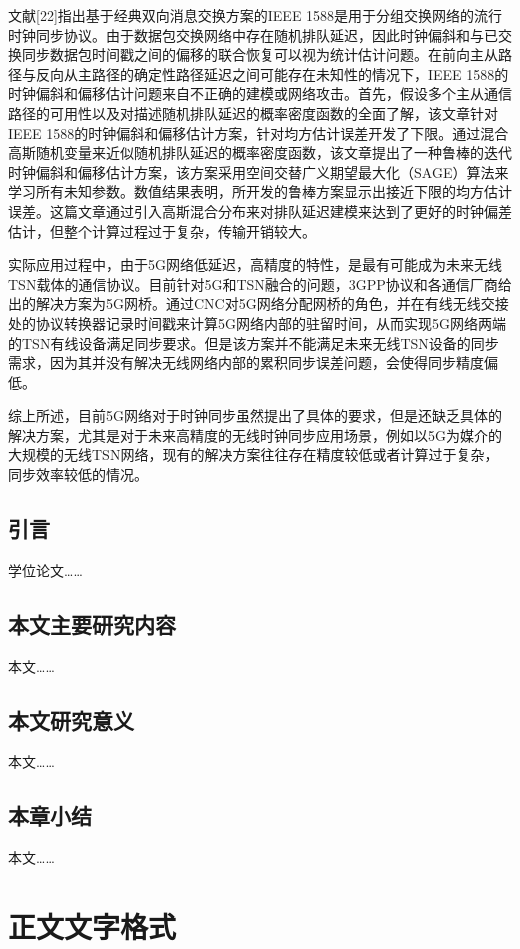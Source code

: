 \documentclass[UTF8,a4paper,12pt]{ctexart}
\numberwithin{equation}{section}
\begin{document}
文献[22]指出基于经典双向消息交换方案的IEEE 1588是用于分组交换网络的流行时钟同步协议。由于数据包交换网络中存在随机排队延迟，因此时钟偏斜和与已交换同步数据包时间戳之间的偏移的联合恢复可以视为统计估计问题。在前向主从路径与反向从主路径的确定性路径延迟之间可能存在未知性的情况下，IEEE 1588的时钟偏斜和偏移估计问题来自不正确的建模或网络攻击。首先，假设多个主从通信路径的可用性以及对描述随机排队延迟的概率密度函数的全面了解，该文章针对IEEE 1588的时钟偏斜和偏移估计方案，针对均方估计误差开发了下限。通过混合高斯随机变量来近似随机排队延迟的概率密度函数，该文章提出了一种鲁棒的迭代时钟偏斜和偏移估计方案，该方案采用空间交替广义期望最大化（SAGE）算法来学习所有未知参数。数值结果表明，所开发的鲁棒方案显示出接近下限的均方估计误差。这篇文章通过引入高斯混合分布来对排队延迟建模来达到了更好的时钟偏差估计，但整个计算过程过于复杂，传输开销较大。


实际应用过程中，由于5G网络低延迟，高精度的特性，是最有可能成为未来无线TSN载体的通信协议。目前针对5G和TSN融合的问题，3GPP协议和各通信厂商给出的解决方案为5G网桥。通过CNC对5G网络分配网桥的角色，并在有线无线交接处的协议转换器记录时间戳来计算5G网络内部的驻留时间，从而实现5G网络两端的TSN有线设备满足同步要求。但是该方案并不能满足未来无线TSN设备的同步需求，因为其并没有解决无线网络内部的累积同步误差问题，会使得同步精度偏低。


综上所述，目前5G网络对于时钟同步虽然提出了具体的要求，但是还缺乏具体的解决方案，尤其是对于未来高精度的无线时钟同步应用场景，例如以5G为媒介的大规模的无线TSN网络，现有的解决方案往往存在精度较低或者计算过于复杂，同步效率较低的情况。
\subsection{引言}
学位论文……
\subsection{本文主要研究内容}
本文……
\subsection{本文研究意义}
本文……
\subsection{本章小结}
本文……

\newpage
{}
\section{正文文字格式}
\end{document}
